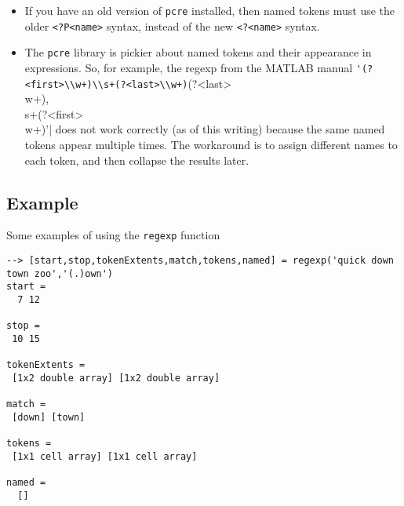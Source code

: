 \begin{itemize}
\item  If you have an old version of \verb|pcre| installed, then named tokens must use the
older \verb|<?P<name>| syntax, instead of the new \verb|<?<name>| syntax.  

\item  The \verb|pcre| library is pickier about named tokens and their appearance in 
expressions.  So, for example, the regexp from the MATLAB 
manual \verb|'(?<first>\\w+)\\s+(?<last>\\w+)|(?<last>\\w+),\\s+(?<first>\\w+)'|
does not work correctly (as of this writing) because the same named 
tokens appear multiple
times.  The workaround is to assign different names to each token, and then collapse
the results later.

\end{itemize}
\subsection{Example}

Some examples of using the \verb|regexp| function
\begin{verbatim}
--> [start,stop,tokenExtents,match,tokens,named] = regexp('quick down town zoo','(.)own')
start = 
  7 12 

stop = 
 10 15 

tokenExtents = 
 [1x2 double array] [1x2 double array] 

match = 
 [down] [town] 

tokens = 
 [1x1 cell array] [1x1 cell array] 

named = 
  []
\end{verbatim}
